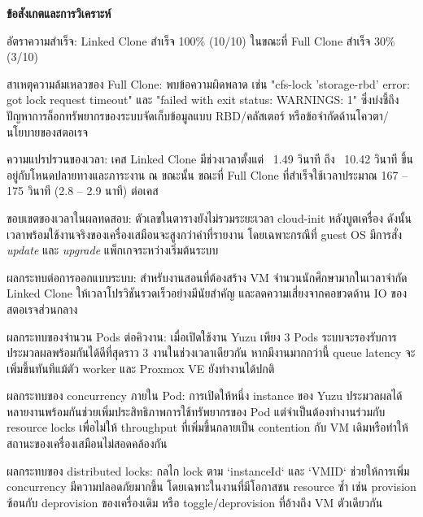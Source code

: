\newpage
\hspace*{1.3em}
\textbf{ข้อสังเกตและการวิเคราะห์}
\begin{mycustomitem}
    \item อัตราความสำเร็จ: Linked Clone สําเร็จ 100\% (10/10) ในขณะที่ Full Clone สําเร็จ 30\% (3/10)
    \item สาเหตุความล้มเหลวของ Full Clone: พบข้อความผิดพลาด เช่น "cfs-lock 'storage-rbd' error: got lock request timeout" และ "failed with exit status: WARNINGS: 1" ซึ่งบ่งชี้ถึงปัญหาการล็อกทรัพยากรของระบบจัดเก็บข้อมูลแบบ RBD/คลัสเตอร์ หรือข้อจํากัดด้านโควตา/นโยบายของสตอเรจ
    \item ความแปรปรวนของเวลา: เคส Linked Clone มีช่วงเวลาตั้งแต่ ~1.49 วินาที ถึง ~10.42 วินาที ขึ้นอยู่กับโหนดปลายทางและภาระงาน ณ ขณะนั้น ขณะที่ Full Clone ที่สําเร็จใช้เวลาประมาณ 167 – 175 วินาที (2.8 – 2.9 นาที) ต่อเคส
    \item ขอบเขตของเวลาในผลทดสอบ: ตัวเลขในตารางยังไม่รวมระยะเวลา cloud-init หลังบูตเครื่อง ดังนั้นเวลาพร้อมใช้งานจริงของเครื่องเสมือนจะสูงกว่าค่าที่รายงาน โดยเฉพาะกรณีที่ guest OS มีการสั่ง \textit{update} และ \textit{upgrade} แพ็กเกจระหว่างเริ่มต้นระบบ
    \item ผลกระทบต่อการออกแบบระบบ: สำหรับงานสอนที่ต้องสร้าง VM จำนวนนักศึกษามากในเวลาจำกัด Linked Clone ให้เวลาโปรวิชันรวดเร็วอย่างมีนัยสําคัญ และลดความเสี่ยงจากคอขวดด้าน IO ของสตอเรจส่วนกลาง
    \item ผลกระทบของจำนวน Pods ต่อคิวงาน: เมื่อเปิดใช้งาน Yuzu เพียง 3 Pods ระบบจะรองรับการประมวลผลพร้อมกันได้ดีที่สุดราว 3 งานในช่วงเวลาเดียวกัน หากมีงานมากกว่านี้ queue latency จะเพิ่มขึ้นทันทีแม้ตัว worker และ Proxmox VE ยังทำงานได้ปกติ
    \item ผลกระทบของ concurrency ภายใน Pod: การเปิดให้หนึ่ง instance ของ Yuzu ประมวลผลได้หลายงานพร้อมกันช่วยเพิ่มประสิทธิภาพการใช้ทรัพยากรของ Pod แต่จำเป็นต้องทำงานร่วมกับ resource locks เพื่อไม่ให้ throughput ที่เพิ่มขึ้นกลายเป็น contention กับ VM เดิมหรือทำให้สถานะของเครื่องเสมือนไม่สอดคล้องกัน
    \item ผลกระทบของ distributed locks: กลไก lock ตาม `instanceId` และ `VMID` ช่วยให้การเพิ่ม concurrency มีความปลอดภัยมากขึ้น โดยเฉพาะในงานที่มีโอกาสชน resource ซ้ำ เช่น provision ซ้อนกับ deprovision ของเครื่องเดิม หรือ toggle/deprovision ที่อ้างถึง VM ตัวเดียวกัน
\end{mycustomitem}

